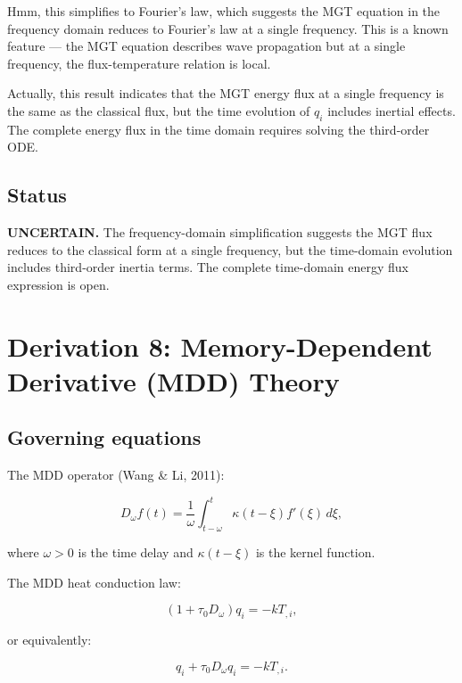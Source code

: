 \documentclass{article}
\begin{document}
Hmm, this simplifies to Fourier's law, which suggests the MGT equation in the frequency domain reduces to Fourier's law at a single frequency. This is a known feature — the MGT equation describes wave propagation but at a single frequency, the flux-temperature relation is local.

Actually, this result indicates that the MGT energy flux at a single frequency is the same as the classical flux, but the time evolution of $q_i$ includes inertial effects. The complete energy flux in the time domain requires solving the third-order ODE.

\subsection{Status}

\textbf{UNCERTAIN.} The frequency-domain simplification suggests the MGT flux reduces to the classical form at a single frequency, but the time-domain evolution includes third-order inertia terms. The complete time-domain energy flux expression is open.

\section{Derivation 8: Memory-Dependent Derivative (MDD) Theory}

\subsection{Governing equations}

The MDD operator (Wang \& Li, 2011):

\begin{equation}
D_\omega f(t) = \frac{1}{\omega}\int_{t-\omega}^{t} \kappa(t-\xi) f'(\xi) \, d\xi,
\label{ef:mdd:1}
\end{equation}

where $\omega > 0$ is the time delay and $\kappa(t-\xi)$ is the kernel function.

The MDD heat conduction law:

\begin{equation}
(1 + \tau_0 D_\omega)q_i = -k T_{,i},
\label{ef:mdd:2}
\end{equation}

or equivalently:

\begin{equation}
q_i + \tau_0 D_\omega q_i = -k T_{,i}.
\label{ef:mdd:3}
\end{equation}
\end{document}
